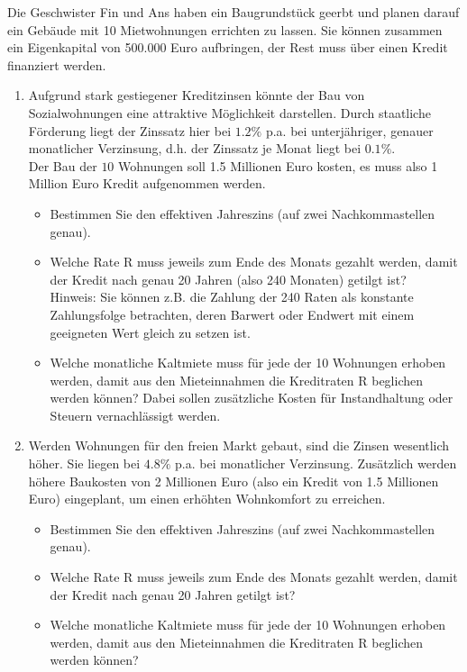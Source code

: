 \begin{Aufgabe}[8] 
	Die Geschwister Fin und Ans haben ein Baugrundstück geerbt und planen darauf ein Gebäude mit 10 Mietwohnungen errichten zu lassen. Sie können zusammen ein Eigenkapital von 500.000 Euro aufbringen, der Rest muss über einen Kredit finanziert werden.
	\begin{enumerate}
		\item Aufgrund stark gestiegener Kreditzinsen könnte der Bau von Sozialwohnungen eine attraktive Möglichkeit darstellen. Durch staatliche Förderung liegt der Zinssatz hier bei $1.2 \%$ p.a. bei unterjähriger, genauer monatlicher Verzinsung, d.h. der Zinssatz je Monat liegt bei $0.1 \%$. \\
		Der Bau der $10$ Wohnungen soll 1.5 Millionen Euro kosten, es muss also 1 Million Euro Kredit aufgenommen werden.
		\begin{itemize}
			\item Bestimmen Sie den effektiven Jahreszins (auf zwei Nachkommastellen genau).
			\item Welche Rate R muss jeweils zum Ende des Monats gezahlt werden, damit der Kredit nach genau 20 Jahren (also 240 Monaten) getilgt ist? \\
			Hinweis: Sie können z.B. die Zahlung der 240 Raten als konstante Zahlungsfolge betrachten, deren Barwert oder Endwert mit einem geeigneten Wert gleich zu setzen ist.
			\item Welche monatliche Kaltmiete muss für jede der 10 Wohnungen erhoben werden, damit aus den Mieteinnahmen die Kreditraten R beglichen werden können? Dabei sollen zusätzliche Kosten für Instandhaltung oder Steuern vernachlässigt werden.
		\end{itemize}
		\item Werden Wohnungen für den freien Markt gebaut, sind die Zinsen wesentlich höher. Sie liegen bei $4.8\%$ p.a. bei monatlicher Verzinsung. Zusätzlich werden höhere Baukosten von 2 Millionen Euro (also ein Kredit von 1.5 Millionen Euro) eingeplant, um einen erhöhten Wohnkomfort zu erreichen.
		\begin{itemize}
			\item Bestimmen Sie den effektiven Jahreszins (auf zwei Nachkommastellen genau).
			\item Welche Rate R muss jeweils zum Ende des Monats gezahlt werden, damit der Kredit nach genau 20 Jahren getilgt ist?
			\item Welche monatliche Kaltmiete muss für jede der 10 Wohnungen erhoben werden, damit aus den Mieteinnahmen die Kreditraten R beglichen werden können?
		\end{itemize} 
	\end{enumerate}
\end{Aufgabe}
